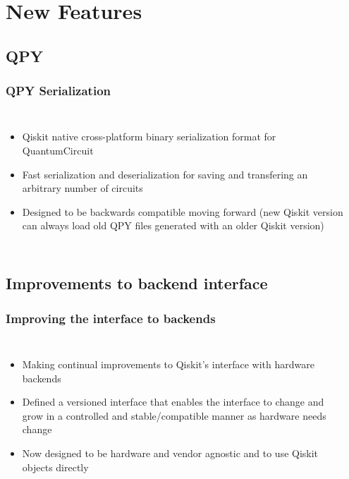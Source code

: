 \documentclass[aspectratio=169,11pt,hyperref={colorlinks=true}]{beamer}
\begin{document}
\section{New Features}
\subsection{QPY}
\begin{frame}
    \frametitle{QPY Serialization}
    \begin{columns}
            \begin{itemize}
                \item Qiskit native cross-platform binary serialization format for QuantumCircuit
                \item Fast serialization and deserialization for saving and
                    transfering an arbitrary number of circuits
                \item Designed to be backwards compatible moving forward (new Qiskit version can always load old QPY files generated with an older Qiskit version)
            \end{itemize}
            \inputminted[fontsize=\tiny]{python}{qpy_demo.py}
    \end{columns}
\end{frame}

\subsection{Improvements to backend interface}
\begin{frame}
    \frametitle{Improving the interface to backends}
    \begin{columns}
            \begin{itemize}
                \item Making continual improvements to Qiskit's interface with
                    hardware backends
                \item Defined a versioned interface that enables the interface
                    to change and grow in a controlled and stable/compatible
                    manner as hardware needs change
                \item Now designed to be hardware and vendor agnostic and to
                    use Qiskit objects directly
            \end{itemize}
            \inputminted[fontsize=\tiny]{python}{backend_demo.py} 
    \end{columns}
\end{frame}
\end{document}
